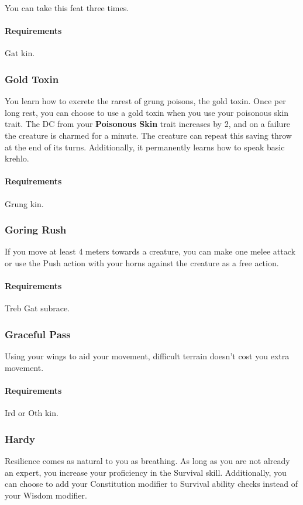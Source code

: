     You can take this feat three times.
    \paragraph{Requirements} Gat kin.
\subsubsection{Gold Toxin} \label{feat::goldtoxin}
    You learn how to excrete the rarest of grung poisons, the gold toxin.
    Once per long rest, you can choose to use a gold toxin when you use your poisonous skin trait.
    The DC from your \textbf{Poisonous Skin} trait increases by 2, and on a failure the creature is charmed for a minute.
    The creature can repeat this saving throw at the end of its turns.
    Additionally, it permanently learns how to speak basic krehlo.
    \paragraph{Requirements} Grung kin.
\subsubsection{Goring Rush} \label{feat::goringrush}
    If you move at least 4 meters towards a creature, you can make one melee attack or use the Push action with your horns against the creature as a free action.
    \paragraph{Requirements} Treb Gat subrace.
\subsubsection{Graceful Pass} \label{feat::gracefulpass}
    Using your wings to aid your movement, difficult terrain doesn't cost you extra movement.
    \paragraph{Requirements} Ird or Oth kin.
\subsubsection{Hardy} \label{feat::hardy}
    Resilience comes as natural to you as breathing.
    As long as you are not already an expert, you increase your proficiency in the Survival skill.
    Additionally, you can choose to add your Constitution modifier to Survival ability checks instead of your Wisdom modifier.
